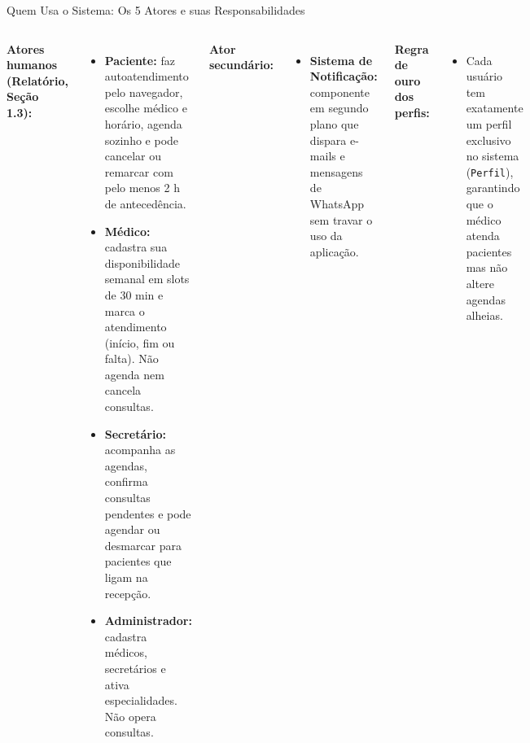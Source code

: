 \documentclass[aspectratio=169,t,xcolor=table]{beamer}
\newcommand{\setLayoutClean}{%
    \usebackgroundtemplate{}%
    \setDefaultConfig%
}
\begin{document}
\setLayoutClean
\begin{frame}{Quem Usa o Sistema: Os 5 Atores e suas Responsabilidades}
    \begin{columns}[T]
        \textbf{Atores humanos (Relatório, Seção 1.3):}
        {\scriptsize
        \begin{itemize}\setlength{\itemsep}{2pt}
            \item \textbf{Paciente:} faz autoatendimento pelo navegador, escolhe médico e horário, agenda sozinho e pode cancelar ou remarcar com pelo menos 2 h de antecedência.
            \item \textbf{Médico:} cadastra sua disponibilidade semanal em slots de 30 min e marca o atendimento (início, fim ou falta). Não agenda nem cancela consultas.
            \item \textbf{Secretário:} acompanha as agendas, confirma consultas pendentes e pode agendar ou desmarcar para pacientes que ligam na recepção.
            \item \textbf{Administrador:} cadastra médicos, secretários e ativa especialidades. Não opera consultas.
        \end{itemize}
        }

        \textbf{Ator secundário:}
        {\scriptsize
        \begin{itemize}\setlength{\itemsep}{2pt}
            \item \textbf{Sistema de Notificação:} componente em segundo plano que dispara e-mails e mensagens de WhatsApp sem travar o uso da aplicação.
        \end{itemize}
        }
        \vspace{0.15cm}
        \textbf{Regra de ouro dos perfis:}
        {\scriptsize
        \begin{itemize}\setlength{\itemsep}{2pt}
            \item Cada usuário tem exatamente um perfil exclusivo no sistema (\texttt{Perfil}), garantindo que o médico atenda pacientes mas não altere agendas alheias.
        \end{itemize}
        }
    \end{columns}
\end{frame}
\end{document}
